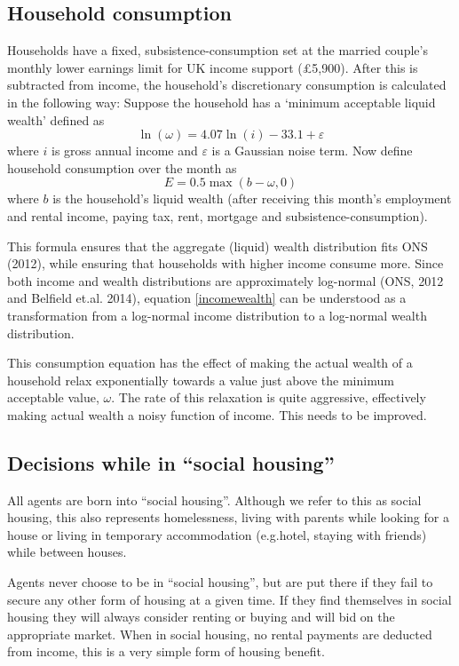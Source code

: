 \documentclass{report}
\begin{document}
\subsection{Household consumption}

Households have a fixed, subsistence-consumption set at the married couple's monthly lower earnings limit for UK income support (\pounds 5,900). After this is subtracted from income, the household's discretionary consumption is calculated in the following way: Suppose the household has a `minimum acceptable liquid wealth' defined as
\begin{equation}
\ln(\omega) = 4.07\ln (i)-33.1+\varepsilon
\label{incomewealth}
\end{equation}
where $i$ is gross annual income and $\varepsilon$ is a Gaussian noise term. Now define household consumption over the month as
\begin{equation}
E=0.5 \max \left( b-\omega,0\right)
\label{consumption}
\end{equation}
where $b$ is the household's liquid wealth (after receiving this month's employment and rental income, paying tax, rent, mortgage and subsistence-consumption).

This formula ensures that the aggregate (liquid) wealth distribution fits ONS (2012), while ensuring that households with higher income consume more. Since both income and wealth distributions are approximately log-normal (ONS, 2012 and Belfield et.al. 2014), equation \ref{incomewealth} can be understood as a transformation from a log-normal income distribution to a log-normal wealth distribution.

This consumption equation has the effect of making the actual wealth of a household relax exponentially towards a value just above the minimum acceptable value, $\omega$. The rate of this relaxation is quite aggressive, effectively making actual wealth a noisy function of income. This needs to be improved.

\subsection{Decisions while in ``social housing''}
All agents are born into ``social housing''. Although we refer to this as social housing, this also represents homelessness, living with parents while looking for a house or living in temporary accommodation (e.g.hotel, staying with friends) while between houses.

Agents never choose to be in ``social housing'', but are put there if they fail to secure any other form of housing at a given time. If they find themselves in social housing they will always consider renting or buying and will bid on the appropriate market. When in social housing, no rental payments are deducted from income, this is a very simple form of housing benefit.
\end{document}
